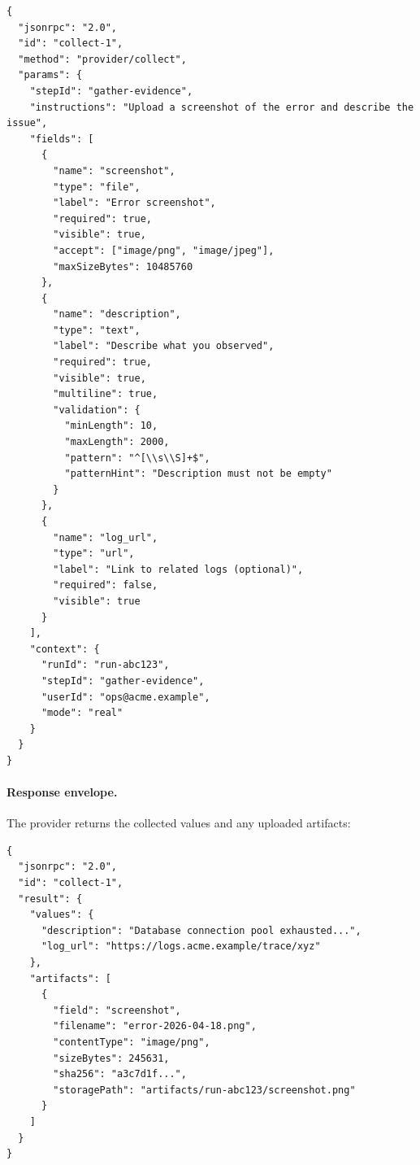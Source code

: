 \begin{verbatim}
{
  "jsonrpc": "2.0",
  "id": "collect-1",
  "method": "provider/collect",
  "params": {
    "stepId": "gather-evidence",
    "instructions": "Upload a screenshot of the error and describe the issue",
    "fields": [
      {
        "name": "screenshot",
        "type": "file",
        "label": "Error screenshot",
        "required": true,
        "visible": true,
        "accept": ["image/png", "image/jpeg"],
        "maxSizeBytes": 10485760
      },
      {
        "name": "description",
        "type": "text",
        "label": "Describe what you observed",
        "required": true,
        "visible": true,
        "multiline": true,
        "validation": {
          "minLength": 10,
          "maxLength": 2000,
          "pattern": "^[\\s\\S]+$",
          "patternHint": "Description must not be empty"
        }
      },
      {
        "name": "log_url",
        "type": "url",
        "label": "Link to related logs (optional)",
        "required": false,
        "visible": true
      }
    ],
    "context": {
      "runId": "run-abc123",
      "stepId": "gather-evidence",
      "userId": "ops@acme.example",
      "mode": "real"
    }
  }
}
\end{verbatim}

\paragraph{Response envelope.}
The provider returns the collected values and any uploaded artifacts:

\begin{verbatim}
{
  "jsonrpc": "2.0",
  "id": "collect-1",
  "result": {
    "values": {
      "description": "Database connection pool exhausted...",
      "log_url": "https://logs.acme.example/trace/xyz"
    },
    "artifacts": [
      {
        "field": "screenshot",
        "filename": "error-2026-04-18.png",
        "contentType": "image/png",
        "sizeBytes": 245631,
        "sha256": "a3c7d1f...",
        "storagePath": "artifacts/run-abc123/screenshot.png"
      }
    ]
  }
}
\end{verbatim}

